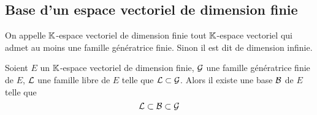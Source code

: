 \subsection{Base d'un espace vectoriel de dimension finie}

\begin{defdef}
  On appelle \(\mathbb{K}\)-espace vectoriel de dimension finie tout \(\mathbb{K}\)-espace 
  vectoriel qui admet au moins une famille génératrice finie. Sinon il est dit 
  de dimension infinie.
\end{defdef}

\begin{theo}
  Soient \(E\) un \(\mathbb{K}\)-espace vectoriel de dimension finie, \(\mathcal{G}\) une famille 
  génératrice finie de \(E\), \(\mathcal{L}\) une famille libre de \(E\) telle que \(\mathcal{L} 
  \subset \mathcal{G}\). Alors il existe une base \(\mathcal{B}\) de \(E\) telle que
  \begin{equation}
    \mathcal{L} \subset \mathcal{B} \subset \mathcal{G}
  \end{equation}
\end{theo}
